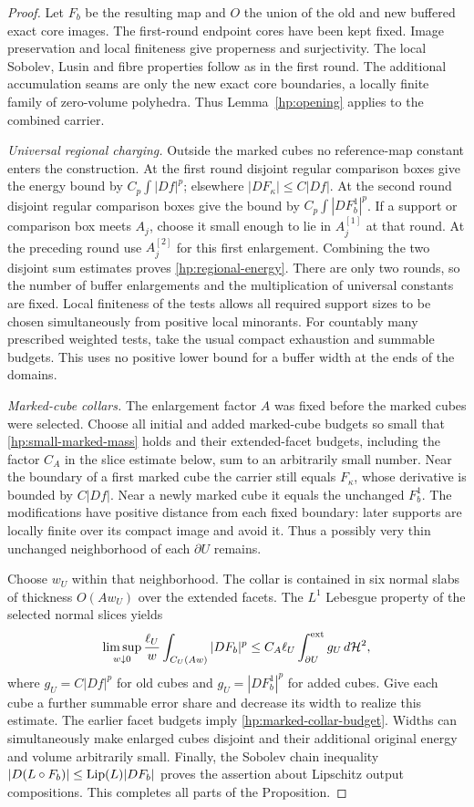 \begin{proof}
Let $F_b$ be the resulting map and $O$ the union of the old and new
buffered exact core images.  The first-round endpoint cores have
been kept fixed.  Image preservation and local finiteness give
properness and surjectivity.  The local Sobolev, Lusin and fibre
properties follow as in the first round.  The additional
accumulation seams are only the new exact core boundaries, a locally
finite family of zero-volume polyhedra.  Thus
Lemma~\ref{hp:opening} applies to the combined carrier.

\emph{Universal regional charging.}
Outside the marked cubes no reference-map constant enters the
construction.  At the first round disjoint regular comparison boxes
give the energy bound by $C_p\int|Df|^p$; elsewhere
$|DF_\kappa|\leq C|Df|$.  At the second round disjoint regular
comparison boxes give the bound by $C_p\int|DF_b^1|^p$.
If a support or comparison box meets $A_j$, choose it small enough
to lie in $A_j^{[1]}$ at that round.  At the preceding round use
$A_j^{[2]}$ for this first enlargement.  Combining the two disjoint
sum estimates proves \eqref{hp:regional-energy}.  There are only two
rounds, so the number of buffer enlargements and the multiplication
of universal constants are fixed.  Local finiteness of the tests
allows all required support sizes to be chosen simultaneously from
positive local minorants.  For countably many prescribed weighted
tests, take the usual compact exhaustion and summable budgets.
This uses no positive lower bound for a buffer width at the ends
of the domains.

\emph{Marked-cube collars.}
The enlargement factor $A$ was fixed before the marked cubes were
selected.  Choose all initial and added marked-cube budgets so small
that \eqref{hp:small-marked-mass} holds and their extended-facet budgets,
including the factor $C_A$ in the slice estimate below, sum to an
arbitrarily small number.  Near the boundary of a first
marked cube the carrier still equals $F_\kappa$, whose derivative
is bounded by $C|Df|$.  Near a newly marked cube it equals the
unchanged $F_b^1$.  The modifications have positive distance from
each fixed boundary: later supports are locally finite over its
compact image and avoid it.  Thus a possibly very thin unchanged
neighborhood of each $\partial U$ remains.

Choose $w_U$ within that neighborhood.  The collar is contained in
six normal slabs of thickness $O(Aw_U)$ over the extended facets.
The $L^1$ Lebesgue property of the selected normal slices yields
\[
 \limsup_{w\downarrow0}\frac{\ell_U}{w}
       \int_{C_U(Aw)}|DF_b|^p
 \leq C_A\ell_U\int_{\partial U}^{\rm ext}g_U\,d\mathcal H^2,
\]
where $g_U=C|Df|^p$ for old cubes and
$g_U=|DF_b^1|^p$ for added cubes.  Give each cube a further summable
error share and decrease its width to realize this estimate.  The
earlier facet budgets imply \eqref{hp:marked-collar-budget}.
Widths can simultaneously make enlarged cubes disjoint and their
additional original energy and volume arbitrarily small.  Finally,
the Sobolev chain inequality
$|D(L\circ F_b)|\leq\operatorname{Lip}(L)|DF_b|$ proves the assertion about
Lipschitz output compositions.  This completes all parts of the
Proposition.
\end{proof}

